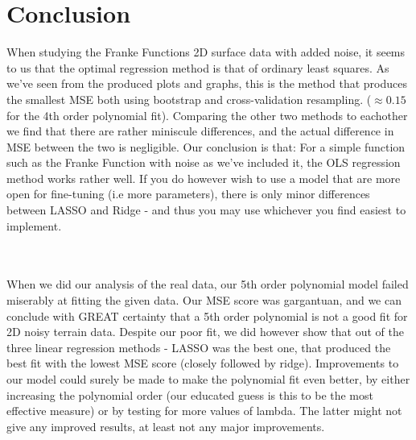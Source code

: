 \documentclass[../main.tex]{subfiles}
\begin{document}
\section{Conclusion}
When studying the Franke Functions 2D surface data with added noise, it seems to us that the optimal regression method is that of ordinary least squares. As we've seen from the produced plots and graphs, this is the method that produces the smallest MSE both using bootstrap and cross-validation resampling. ($\approx 0.15$ for the 4th order polynomial fit). Comparing the other two methods to eachother we find that there are rather miniscule differences, and the actual difference in MSE between the two is negligible.
Our conclusion is that: For a simple function such as the Franke Function with noise as we've included it, the OLS regression method works rather well. If you do however wish to use a model that are more open for fine-tuning (i.e more parameters), there is only minor differences between LASSO and Ridge - and thus you may use whichever you find easiest to implement.

\\ \\ \indent When we did our analysis of the real data, our 5th order polynomial model failed miserably at fitting the given data. Our MSE score was gargantuan, and we can conclude with GREAT certainty that a 5th order polynomial is not a good fit for 2D noisy terrain data. Despite our poor fit, we did however show that out of the three linear regression methods - LASSO was the best one, that produced the best fit with the lowest MSE score (closely followed by ridge). Improvements to our model could surely be made to make the polynomial fit even better, by either increasing the polynomial order (our educated guess is this to be the most effective measure) or by testing for more values of lambda. The latter might not give any improved results, at least not any major improvements.
\end{document}

